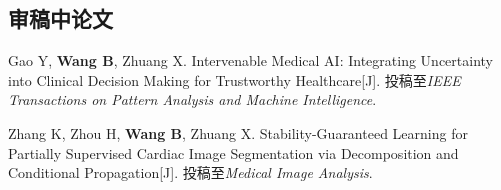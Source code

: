 \subsection*{审稿中论文}
\begin{enumerate}[leftmargin=2.3em,label={[\arabic*]},itemsep=0.55em,topsep=0.4em]
  \item Gao Y, \textbf{Wang B}, Zhuang X. Intervenable Medical AI: Integrating Uncertainty into Clinical Decision Making for Trustworthy Healthcare[J]. 投稿至\emph{IEEE Transactions on Pattern Analysis and Machine Intelligence}.

  \item Zhang K, Zhou H, \textbf{Wang B}, Zhuang X. Stability-Guaranteed Learning for Partially Supervised Cardiac Image Segmentation via Decomposition and Conditional Propagation[J]. 投稿至\emph{Medical Image Analysis}.
\end{enumerate}

